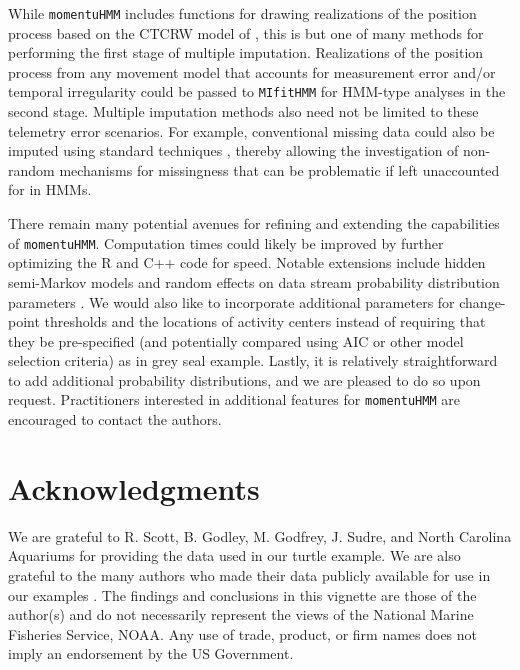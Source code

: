 \documentclass[12pt]{article}\usepackage[]{graphicx}\usepackage[]{color}
\begin{document}
While \verb|momentuHMM| includes functions for drawing realizations of the position process based on the CTCRW model of \cite{JohnsonEtAl2008}, this is but one of many methods for performing the first stage of multiple imputation. Realizations of the position process from any movement model that accounts for measurement error and/or temporal irregularity \citep[e.g.][]{CalabreseEtAl2016,GurarieEtAl2017} could be passed to \verb|MIfitHMM| for HMM-type analyses in the second stage. Multiple imputation methods also need not be limited to these telemetry error scenarios. For example, conventional missing data could also be imputed using standard techniques \citep{RubinSchenker1986}, thereby allowing the investigation of non-random mechanisms for missingness that can be problematic if left unaccounted for in HMMs.

There remain many potential avenues for refining and extending the capabilities of \verb|momentuHMM|. Computation times could likely be improved by further optimizing the R and C++ code for speed. Notable extensions include hidden semi-Markov models and random effects on data stream probability distribution parameters \citep{ZucchiniEtAl2016}. We would also like to incorporate additional parameters for change-point thresholds and the locations of activity centers instead of requiring that they be pre-specified (and potentially compared using AIC or other model selection criteria) as in grey seal example. Lastly, it is relatively straightforward to add additional probability distributions, and we are pleased to do so upon request. Practitioners interested in additional features for \verb|momentuHMM| are encouraged to contact the authors.

\section*{Acknowledgments} 
We are grateful to R. Scott, B. Godley, M. Godfrey, J. Sudre, and North Carolina Aquariums for providing the data used in our turtle example. We are also grateful to the many authors who made their data publicly available for use in our examples \citep{WallEtAl2014,PirottaEtAl2018,IsojunnoEtAl2017,Leos-BarajasEtAl2017,AdamEtAl2019}. The findings and conclusions in this vignette are those of the author(s) and do not necessarily represent the views of the National Marine Fisheries Service, NOAA. Any use of trade, product, or firm names does not imply an endorsement by the US Government.




\clearpage
\end{document}
